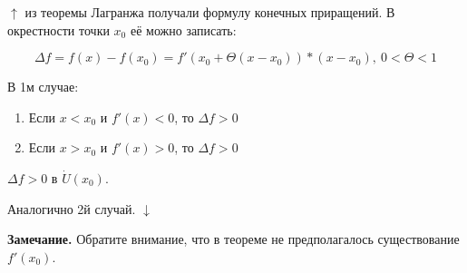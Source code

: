 \documentclass{article}
\begin{document}
\(\uparrow\) из теоремы Лагранжа получали формулу конечных приращений. В окрестности точки \(x_0\) её можно записать:

\[\Delta f = f(x) - f(x_0) = f'(x_0 + \Theta(x-x_0))*(x-x_0),\ 0 < \Theta < 1\]

В 1м случае:
\begin{enumerate}
    \item Если \(x < x_0\) и \(f'(x) < 0\), то \(\Delta f > 0\)
    \item Если \(x > x_0\) и \(f'(x) > 0\), то \(\Delta f > 0\)
\end{enumerate}
\(\Delta f > 0\) в \(\dot{U}(x_0)\).

Аналогично 2й случай. \(\downarrow\)

\textbf{Замечание.} Обратите внимание, что в теореме не предполагалось существование \(f'(x_0)\).
\end{document}
